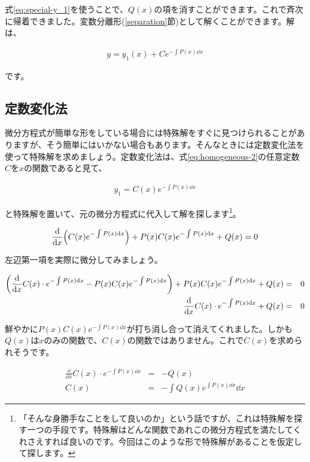 \noindent
式\ref{eq:special-y_1}を使うことで、$Q(x)$の項を消すことができます。これで斉次に帰着できました。変数分離形(\ref{separation}節)として解くことができます。解は、

\begin{eqnarray}
    y=y_1(x)+Ce^{-\int P(x)\dd x}
    \label{eq:homogeneous-special}
\end{eqnarray}

\noindent
です。







\subsection{定数変化法}
\label{constant-change}
微分方程式が簡単な形をしている場合には特殊解をすぐに見つけられることがありますが、そう簡単にはいかない場合もあります。そんなときには定数変化法を使って特殊解を求めましょう。定数変化法は、式\ref{eq:homogeneous-2}の任意定数$C$を$x$の関数であると見て、

\begin{eqnarray}
    y_1=C(x)e^{-\int P(x)\dd x}
    \label{eq:constant-change}
\end{eqnarray}

\noindent
と特殊解を置いて、元の微分方程式に代入して解を探します\footnote{「そんな身勝手なことをして良いのか」という話ですが、これは特殊解を探す一つの手段です。特殊解はどんな関数であれこの微分方程式を満たしてくれさえすれば良いのです。今回はこのような形で特殊解があることを仮定して探します。}。

\begin{eqnarray}
    \frac{\dd}{\dd x}\pqty{C(x)e^{-\int P(x)\dd x}}+P(x)C(x)e^{-\int P(x)\dd x}+Q(x)=0
\end{eqnarray}

\noindent
左辺第一項を実際に微分してみましょう。

\begin{eqnarray}
    \pqty{\frac{\dd}{\dd x}C(x)\cdot e^{-\int P(x)\dd x}-P(x)C(x)e^{-\int P(x)\dd x}}+P(x)C(x)e^{-\int P(x)\dd x}+Q(x)&=&0 \nonumber\\
    \frac{\dd}{\dd x}C(x)\cdot e^{-\int P(x)\dd x}+Q(x)&=&0
\end{eqnarray}

鮮やかに$P(x)C(x)e^{-\int P(x)\dd x}$が打ち消し合って消えてくれました。しかも$Q(x)$は$x$のみの関数で、$C(x)$の関数ではありません。これで$C(x)$を求められそうです。

\begin{eqnarray}
    \frac{\dd}{\dd x}C(x)\cdot e^{-\int P(x)\dd x}&=&-Q(x) \\
    C(x)&=&-\int Q(x)e^{\int P(x)\dd x}\dd x
    \label{eq:constant-change-C}
\end{eqnarray}

